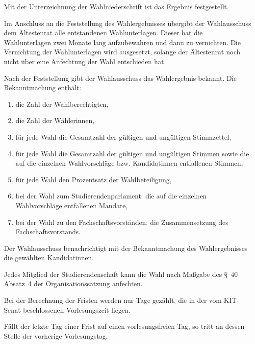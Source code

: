 \begin{jurdoc}
Mit der Unterzeichnung der Wahlniederschrift ist das Ergebnis festgestellt.

Im Anschluss an die Feststellung des Wahlergebnisses übergibt der Wahlausschuss dem Ältestenrat alle entstandenen Wahlunterlagen. Dieser hat die Wahlunterlagen zwei Monate lang aufzubewahren und dann zu vernichten. Die Vernichtung der Wahlunterlagen wird ausgesetzt, solange der Ältestenrat noch nicht über eine Anfechtung der Wahl entschieden hat.

\label{wahl:ergebnis}
Nach der Feststellung gibt der Wahlausschuss das Wahlergebnis bekannt. Die Bekanntmachung enthält: 
\begin{enumerate}
    \item die Zahl der Wahlberechtigten,
    \item die Zahl der Wählerinnen,
    \item für jede Wahl die Gesamtzahl der gültigen und ungültigen Stimmzettel,
    \item für jede Wahl die Gesamtzahl der gültigen und ungültigen Stimmen sowie die auf die einzelnen Wahlvorschläge bzw. Kandidatinnen entfallenen Stimmen,
    \item für jede Wahl den Prozentsatz der Wahlbeteiligung,
    \item bei der Wahl zum Studierendenparlament: die auf die einzelnen Wahlvorschläge entfallenen Mandate,
    \item bei der Wahl zu den Fachschaftsvorständen: die Zusammensetzung des Fachschaftsvorstands.
\end{enumerate}

Der Wahlausschuss benachrichtigt mit der Bekanntmachung des Wahlergebnisses die gewählten Kandidatinnen. 

\label{wahl:wahlanfechtung}
Jedes Mitglied der Studierendenschaft kann die Wahl nach Maßgabe des §~40 Absatz~4 der Organisationssatzung anfechten.

\label{wahl:fristen}
Bei der Berechnung der Fristen werden nur Tage gezählt, die in der vom KIT-Senat beschlossenen Vorlesungszeit liegen.

Fällt der letzte Tag einer Frist auf einen vorlesungsfreien Tag, so tritt an dessen Stelle der vorherige Vorlesungstag.

\end{jurdoc}
